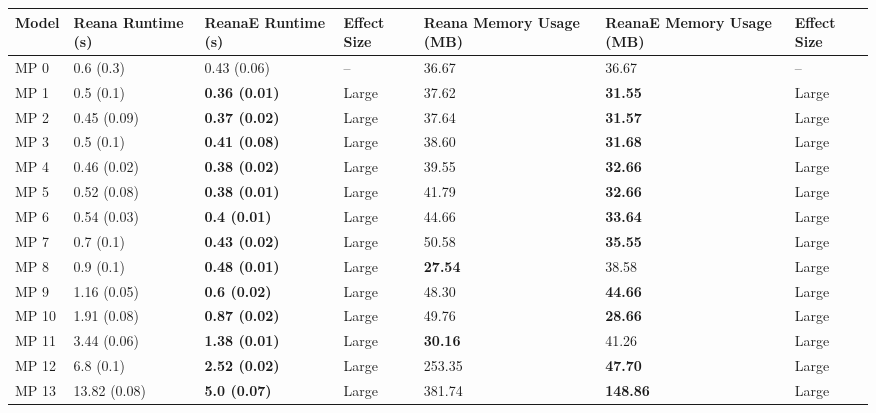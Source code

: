\begin{tabular}{lllllll}
\toprule
Model & Reana Runtime (s) &    ReanaE Runtime (s) & Effect Size & Reana Memory Usage (MB) & ReanaE Memory Usage (MB) & Effect Size \\
\midrule
 MP 0 &         0.6 (0.3) &           0.43 (0.06) &          -- &                   36.67 &                    36.67 &          -- \\
 MP 1 &         0.5 (0.1) &  \textbf{0.36 (0.01)} &       Large &                   37.62 &           \textbf{31.55} &       Large \\
 MP 2 &       0.45 (0.09) &  \textbf{0.37 (0.02)} &       Large &                   37.64 &           \textbf{31.57} &       Large \\
 MP 3 &         0.5 (0.1) &  \textbf{0.41 (0.08)} &       Large &                   38.60 &           \textbf{31.68} &       Large \\
 MP 4 &       0.46 (0.02) &  \textbf{0.38 (0.02)} &       Large &                   39.55 &           \textbf{32.66} &       Large \\
 MP 5 &       0.52 (0.08) &  \textbf{0.38 (0.01)} &       Large &                   41.79 &           \textbf{32.66} &       Large \\
 MP 6 &       0.54 (0.03) &   \textbf{0.4 (0.01)} &       Large &                   44.66 &           \textbf{33.64} &       Large \\
 MP 7 &         0.7 (0.1) &  \textbf{0.43 (0.02)} &       Large &                   50.58 &           \textbf{35.55} &       Large \\
 MP 8 &         0.9 (0.1) &  \textbf{0.48 (0.01)} &       Large &          \textbf{27.54} &                    38.58 &       Large \\
 MP 9 &       1.16 (0.05) &   \textbf{0.6 (0.02)} &       Large &                   48.30 &           \textbf{44.66} &       Large \\
MP 10 &       1.91 (0.08) &  \textbf{0.87 (0.02)} &       Large &                   49.76 &           \textbf{28.66} &       Large \\
MP 11 &       3.44 (0.06) &  \textbf{1.38 (0.01)} &       Large &          \textbf{30.16} &                    41.26 &       Large \\
MP 12 &         6.8 (0.1) &  \textbf{2.52 (0.02)} &       Large &                  253.35 &           \textbf{47.70} &       Large \\
MP 13 &      13.82 (0.08) &   \textbf{5.0 (0.07)} &       Large &                  381.74 &          \textbf{148.86} &       Large \\

\end{tabular}
